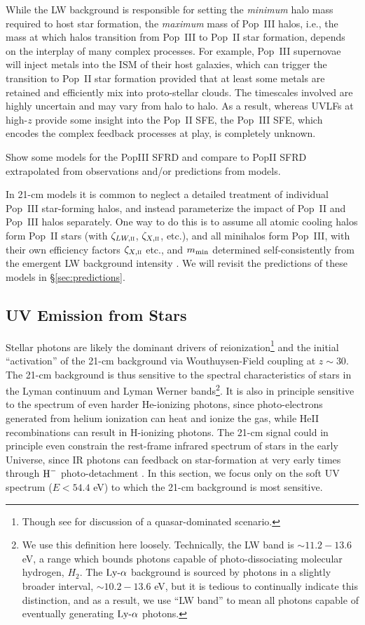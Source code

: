 While the LW background is responsible for setting the \textit{minimum} halo mass required to host star formation, the \textit{maximum} mass of Pop~III halos, i.e., the mass at which halos transition from Pop~III to Pop~II star formation, depends on the interplay of many complex processes. For example, Pop~III supernovae will inject metals into the ISM of their host galaxies, which can trigger the transition to Pop~II star formation provided that at least some metals are retained and efficiently mix into proto-stellar clouds. The timescales involved are highly uncertain and may vary from halo to halo. As a result, whereas UVLFs at high-$z$ provide some insight into the Pop~II SFE, the Pop~III SFE, which encodes the complex feedback processes at play, is completely unknown. 

{\color{red} Show some models for the PopIII SFRD and compare to PopII SFRD extrapolated from observations and/or predictions from models.}


In 21-cm models it is common to neglect a detailed treatment of individual Pop~III star-forming halos, and instead parameterize the impact of Pop~II and Pop~III halos separately. One way to do this is to assume all atomic cooling halos form Pop~II stars (with $\zeta_{LW,\textsc{ii}}$, $\zeta_{X,\textsc{ii}}$, etc.), and all minihalos form Pop~III, with their own efficiency factors $\zeta_{X,\textsc{ii}}$ etc., and $m_{\text{min}}$ determined self-consistently from the emergent LW background intensity \cite{Fialkov2014a,Mirocha2018}. We will revisit the predictions of these models in \S\ref{sec:predictions}. 


\subsection{UV Emission from Stars} \label{sec:UV}
Stellar photons are likely the dominant drivers of reionization\footnote{Though see \cite{Madau2015} for discussion of a quasar-dominated scenario.} and the initial ``activation'' of the 21-cm background via Wouthuysen-Field coupling at $z \sim 30$. The 21-cm background is thus sensitive to the spectral characteristics of stars in the Lyman continuum and Lyman Werner bands\footnote{We use this definition here loosely. Technically, the LW band is $\sim 11.2-13.6$ eV, a range which bounds photons capable of photo-dissociating molecular hydrogen, $H_2$. The $\text{Ly-}\alpha$ background is sourced by photons in a slightly broader interval, $\sim 10.2-13.6$ eV, but it is tedious to continually indicate this distinction, and as a result, we use ``LW band'' to mean all photons capable of eventually generating $\text{Ly-}\alpha$ photons.}. It is also in principle sensitive to the spectrum of even harder He-ionizing photons, since photo-electrons generated from helium ionization can heat and ionize the gas, while HeII recombinations can result in H-ionizing photons. The 21-cm signal could in principle even constrain the rest-frame infrared spectrum of stars in the early Universe, since IR photons can feedback on star-formation at very early times through $\text{H}^{-}$ photo-detachment \cite{WolcottGreen2012}. In this section, we focus only on the soft UV spectrum ($E < 54.4$ eV) to which the 21-cm background is most sensitive.

